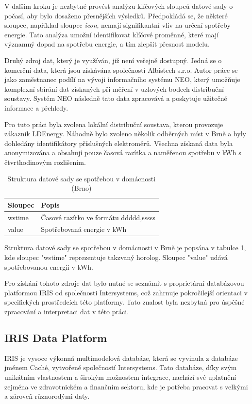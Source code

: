 \documentclass[FM,BP,fonts]{tulthesis}
\begin{document}
V dalším kroku je nezbytné provést analýzu klíčových sloupců datové sady o počasí, aby bylo dosaženo přesnějších výsledků. Předpokládá se, že některé sloupce, například sloupec \textit{icon}, nemají signifikantní vliv na určení spotřeby energie. Tato analýza umožní identifikovat klíčové proměnné, které mají významný dopad na spotřebu energie, a tím zlepšit přesnost modelu.

Druhý zdroj dat, který je využíván, již není veřejně dostupný. Jedná se o komerční data, která jsou získávána společností Albistech s.r.o. Autor práce se jako zaměstnanec podílí na vývoji informačního systému NEO, který umožňuje komplexní sbírání dat získaných při měření v uzlových bodech distribuční soustavy. Systém NEO následně tato data zpracovává a poskytuje užitečné informace a přehledy.

Pro tuto práci byla zvolena lokální distribuční soustava, kterou provozuje zákazník LDEnergy. Náhodně bylo zvoleno několik odběrných míst v Brně a byly dohledány identifikátory příslušných elektroměrů. Všechna získaná data byla anonymizována a obsahují pouze časová razítka a naměřenou spotřebu v kWh s čtvrthodinovým rozlišením.


\begin{table}[!ht]
	\centering
	\caption{Struktura datové sady se spotřebou v domácnosti (Brno)}
	\label{structure-brno}
	\begin{tabularx}{\linewidth}{ll}
		\hline
		\textbf{Sloupec} & \textbf{Popis} \\ \hline
		wstime & Časové razítko ve formátu ddddd,sssss \\ 
		value & Spotřebovaná energie v kWh \\ 
		\hline
	\end{tabularx}
\end{table}

Struktura datové sady se spotřebou v domácnosti v Brně je popsána v tabulce \ref{structure-brno}, kde sloupec "wstime" reprezentuje takzvaný horolog. Sloupec "value" udává spotřebovanou energii v kWh.

Pro získání tohoto zdroje dat bylo nutné se seznámit s proprietární databázovou platformou IRIS od společnosti Intersystems, což zahrnuje pokročilejší orientaci v specifických prostředcích této platformy. Tato znalost byla nezbytná pro úspěšné zpracování a interpretaci dat v této práci.


\newpage
\subsection{IRIS Data Platform}
IRIS je vysoce výkonná multimodelová databáze, která se vyvinula z databáze jménem Caché, vytvořené společností Intersystems. Tato databáze, díky svým unikátním vlastnostem a širokým možnostem integrace, nachází své uplatnění zejména ve zdravotnickém a finančním sektoru, kde je potřeba pracovat s velkými a zároveň různorodými daty.
\end{document}
